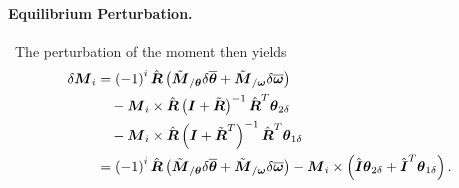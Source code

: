 \documentclass[10pt,dvips,fleqn,subeqn]{report}
\newcommand{\T}[1]{\boldsymbol{#1}}
\begin{document}
\paragraph{Equilibrium Perturbation.} \
The perturbation of the moment then yields
\begin{align}
	\delta\T{M}_i
	&= \plbr{-1}^i \hat{\T{R}} \plbr{
		\tilde{\T{M}}_{/\T{\theta}} \delta\overline{\T{\theta}}
		+ \tilde{\T{M}}_{/\T{\omega}} \delta\overline{\T{\omega}}
	} \nonumber \\
	& \mbox{\hspace{10pt}} - \T{M}_i \times \hat{\T{R}}
		\plbr{\T{I} + \tilde{\T{R}}}^{-1} \hat{\T{R}}^T \T{\theta}_{2\delta}
	\nonumber \\
	& \mbox{\hspace{10pt}} - \T{M}_i \times \hat{\T{R}} 
		\plbr{\T{I} + \tilde{\T{R}}^T}^{-1} \hat{\T{R}}^T \T{\theta}_{1\delta} \\
	&= \plbr{-1}^i \hat{\T{R}} \plbr{
		\tilde{\T{M}}_{/\T{\theta}} \delta\overline{\T{\theta}}
		+ \tilde{\T{M}}_{/\T{\omega}} \delta\overline{\T{\omega}}
	} - \T{M}_i \times \plbr{
		\hat{\T{I}} \T{\theta}_{2\delta}
		+ \hat{\T{I}}^T \T{\theta}_{1\delta}
	} .
\end{align}
\end{document}
